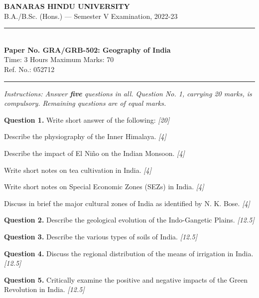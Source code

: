 \documentclass[11pt,a4paper]{article}
\newcommand{\pts}[1]{\hfill   \textit{[#1]}}
\begin{document}
\begin{center}
  {\large\bfseries BANARAS HINDU UNIVERSITY}\\[2pt]
  {\normalsize B.A./B.Sc. (Hons.) --- Semester V Examination, 2022-23}\\[6pt]
  \rule{0.8\linewidth}{0.5pt}\\[6pt]
  {\large\bfseries Paper No. GRA/GRB-502: Geography of India}\\[4pt]
  {\normalsize Time: 3 Hours \hfill Maximum Marks: 70}\\[2pt]
  {\small Ref. No.: 052712}
\end{center}
\rule{\linewidth}{0.4pt}
\smallskip



\noindent   \textit{Instructions: Answer   \textbf{five} questions in all. Question No. 1, carrying 20 marks, is compulsory. Remaining questions are of equal marks.}
\bigskip




\noindent   \textbf{Question 1.} Write short answer of the following: \pts{20}

\begin{parts}
  \item Describe the physiography of the Inner Himalaya. \pts{4}
  \item Describe the impact of El Niño on the Indian Monsoon. \pts{4}
  \item Write short notes on tea cultivation in India. \pts{4}
  \item Write short notes on Special Economic Zones (SEZs) in India. \pts{4}
  \item Discuss in brief the major cultural zones of India as identified by N. K. Bose. \pts{4}
\end{parts}

\medskip


\noindent   \textbf{Question 2.} Describe the geological evolution of the Indo-Gangetic Plains. \pts{12.5}

\medskip


\noindent   \textbf{Question 3.} Describe the various types of soils of India. \pts{12.5}

\medskip


\noindent   \textbf{Question 4.} Discuss the regional distribution of the means of irrigation in India. \pts{12.5}

\medskip


\noindent   \textbf{Question 5.} Critically examine the positive and negative impacts of the Green Revolution in India. \pts{12.5}
\end{document}
